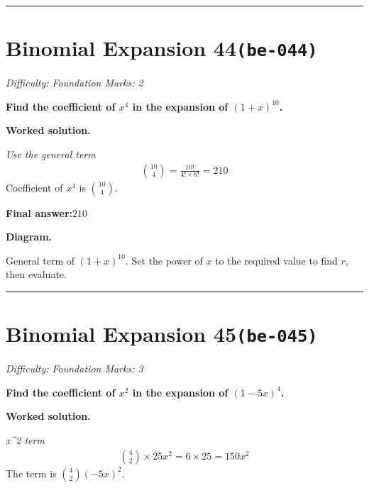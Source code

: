 \documentclass[11pt]{article}
\newcommand{\question}[1]{\par\medskip\noindent\textbf{#1}\par}
\begin{document}
\medskip\hrule

\section*{Binomial Expansion 44\quad\small\texttt{(be-044)}}
\textit{Difficulty: Foundation \quad\textbar\quad Marks: 2}

\question{Find the coefficient of \( x^4 \) in the expansion of \( (1 + x)^{10} \).}

\textbf{Worked solution.}

\textit{Use the general term}
\[\begin{gathered}
\binom{10}{4} = \frac{10!}{4! \times 6!} = 210
\end{gathered}\]
Coefficient of \( x^4 \) is \( \binom{10}{4} \).

\begin{answerbox}
\textbf{Final answer:}\quad \(\displaystyle 210\)
\end{answerbox}
\textbf{Diagram.}

\begin{center}
\end{center}
\small General term of $\left(1+x\right)^{10}$. Set the power of $x$ to the required value to find $r$, then evaluate.\normalsize

\medskip\hrule

\section*{Binomial Expansion 45\quad\small\texttt{(be-045)}}
\textit{Difficulty: Foundation \quad\textbar\quad Marks: 3}

\question{Find the coefficient of \( x^2 \) in the expansion of \( (1 - 5x)^4 \).}

\textbf{Worked solution.}

\textit{x\textasciicircum 2 term}
\[\begin{gathered}
\binom{4}{2} \times 25x^2 = 6 \times 25 = 150x^2
\end{gathered}\]
The term is \( \binom{4}{2}(-5x)^2 \).
\end{document}
